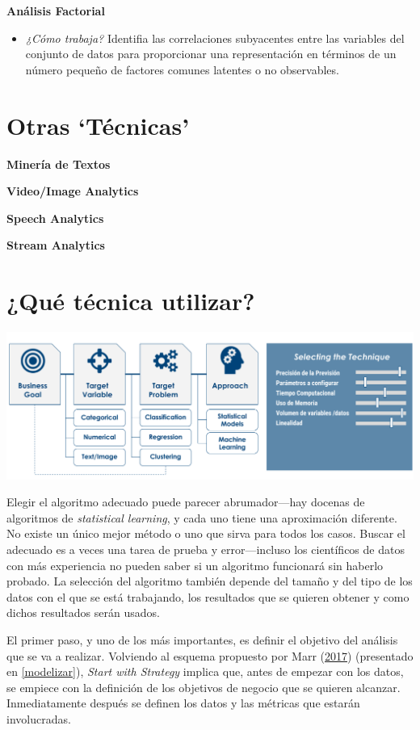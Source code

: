 \documentclass[]{book}
\providecommand{\tightlist}{%
  \setlength{\itemsep}{0pt}\setlength{\parskip}{0pt}}
\begin{document}
\textbf{Análisis Factorial}

\begin{itemize}
\tightlist
\item
  \emph{¿Cómo trabaja?} Identifia las correlaciones subyacentes entre las variables del conjunto de datos para proporcionar una representación en términos de un número pequeño de factores comunes latentes o no observables.
\end{itemize}

\hypertarget{otras-tecnicas}{%
\section{Otras `Técnicas'}\label{otras-tecnicas}}

\textbf{Minería de Textos}

\textbf{Video/Image Analytics}

\textbf{Speech Analytics}

\textbf{Stream Analytics}

\hypertarget{que-tecnica-utilizar}{%
\section{¿Qué técnica utilizar?}\label{que-tecnica-utilizar}}

\includegraphics[width=0.9\linewidth]{imgs/choosealgorithm}

Elegir el algoritmo adecuado puede parecer abrumador---hay docenas de algoritmos de \emph{statistical learning}, y cada uno tiene una aproximación diferente. No existe un único mejor método o uno que sirva para todos los casos. Buscar el adecuado es a veces una tarea de prueba y error---incluso los científicos de datos con más experiencia no pueden saber si un algoritmo funcionará sin haberlo probado. La selección del algoritmo también depende del tamaño y del tipo de los datos con el que se está trabajando, los resultados que se quieren obtener y como dichos resultados serán usados.

El primer paso, y uno de los más importantes, es definir el objetivo del análisis que se va a realizar. Volviendo al esquema propuesto por Marr (\protect\hyperlink{ref-mar2015}{2017}) (presentado en \ref{modelizar}), \emph{Start with Strategy} implica que, antes de empezar con los datos, se empiece con la definición de los objetivos de negocio que se quieren alcanzar. Inmediatamente después se definen los datos y las métricas que estarán involucradas.
\end{document}

